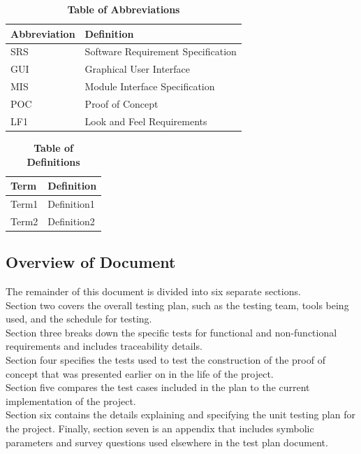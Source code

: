 \documentclass[12pt, titlepage]{article}
\begin{document}
\begin{table}[hbp]
\caption{\textbf{Table of Abbreviations}} \label{Table}

\begin{tabularx}{\textwidth}{p{3cm}X}
\toprule
\textbf{Abbreviation} & \textbf{Definition} \\
\midrule
SRS & Software Requirement Specification\\
GUI & Graphical User Interface\\
MIS & Module Interface Specification\\
POC & Proof of Concept \\
LF1 & Look and Feel Requirements\\
\bottomrule
\end{tabularx}

\end{table}

\begin{table}[!htbp]
\caption{\textbf{Table of Definitions}} \label{Table}
\begin{tabularx}{\textwidth}{p{3cm}X}
\toprule
\textbf{Term} & \textbf{Definition}\\
\midrule
Term1 & Definition1\\
Term2 & Definition2\\
\bottomrule
\end{tabularx}

\end{table}	

\subsection{Overview of Document}
The remainder of this document is divided into six separate sections. \\
Section two covers the overall testing plan, such as the testing team, tools being used, and the schedule for testing.\\ 
Section three breaks down the specific tests for functional and non-functional requirements and includes traceability details.\\
Section four specifies the tests used to test the construction of the proof of concept that was presented earlier on in the life of the project.\\
Section five compares the test cases included in the plan to the current implementation of the project.\\
Section six contains the details explaining and specifying the unit testing plan for the project.
Finally, section seven is an appendix that includes symbolic parameters and survey questions used elsewhere in the test plan document.
\end{document}
